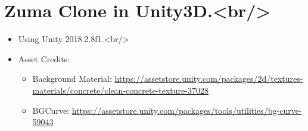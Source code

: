 \documentclass[9pt, b5paper]{article}
\begin{document}
\section{Zuma Clone in Unity3D.<br/>}
\label{sec-2}
\begin{itemize}
\item Using Unity 2018.2.8f1.<br/>
\item Asset Credits:
\begin{itemize}
\item Background Material: \url{https://assetstore.unity.com/packages/2d/textures-materials/concrete/clean-concrete-texture-37028}
\item BGCurve: \url{https://assetstore.unity.com/packages/tools/utilities/bg-curve-59043}
\end{itemize}
\end{itemize}
\end{document}
